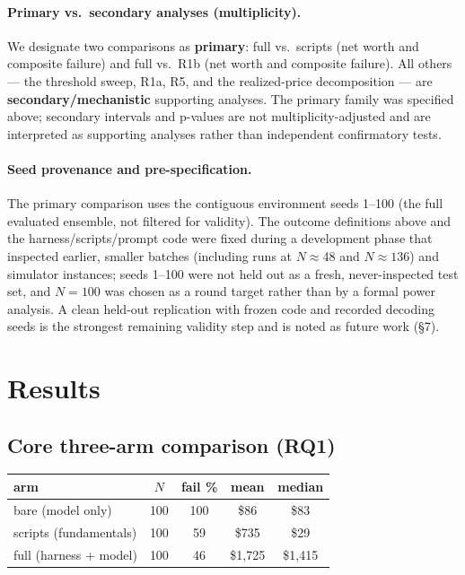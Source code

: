 \documentclass[11pt]{article}
\begin{document}
\paragraph{Primary vs.\ secondary analyses (multiplicity).} We designate two
comparisons as \textbf{primary}: full vs.\ scripts (net worth and composite
failure) and full vs.\ R1b (net worth and composite failure). All others ---
the threshold sweep, R1a, R5, and the realized-price decomposition --- are
\textbf{secondary/mechanistic} supporting analyses. The primary family was
specified above; secondary intervals and p-values are not multiplicity-adjusted
and are interpreted as supporting analyses rather than independent confirmatory
tests.

\paragraph{Seed provenance and pre-specification.} The primary comparison uses
the contiguous environment seeds 1--100 (the full evaluated ensemble, not
filtered for validity). The outcome definitions above and the
harness/scripts/prompt code were fixed during a development phase that
inspected earlier, smaller batches (including runs at $N\approx48$ and
$N\approx136$) and simulator instances; seeds 1--100 were not held out as a
fresh, never-inspected test set, and $N=100$ was chosen as a round target
rather than by a formal power analysis. A clean held-out replication with
frozen code and recorded decoding seeds is the strongest remaining validity
step and is noted as future work (\S7).

\section{Results}

\subsection{Core three-arm comparison (RQ1)}

\begin{table}[h]
\centering
\begin{tabular}{lcccc}
\toprule
arm & $N$ & fail \% & mean & median \\
\midrule
bare (model only)      & 100 & 100 & \$86    & \$83 \\
scripts (fundamentals) & 100 & 59  & \$735   & \$29 \\
full (harness + model) & 100 & 46  & \$1,725 & \$1,415 \\
\bottomrule
\end{tabular}
\end{table}
\end{document}
